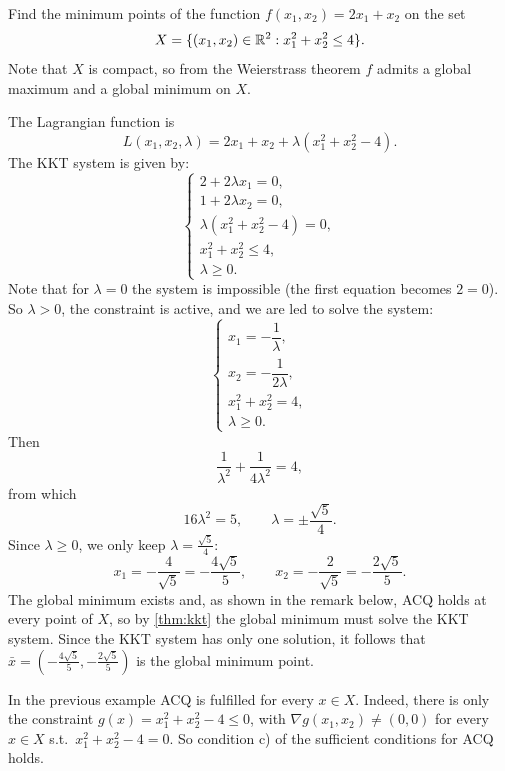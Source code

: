 \begin{example}
    \label{ex:kkt-circle}
    Find the minimum points of the function $f(x_1, x_2) = 2x_1 + x_2$ on the set
    \[
        X = \{(x_1, x_2) \in \mathbb{R}^2 : x_1^2 + x_2^2 \le 4\}.
    \]
    Note that $X$ is compact, so from the Weierstrass theorem $f$ admits a global maximum and a global minimum on $X$.

    The Lagrangian function is
    \[
        L(x_1, x_2, \lambda) = 2x_1 + x_2 + \lambda(x_1^2 + x_2^2 - 4).
    \]
    The KKT system is given by:
    \[
        \begin{cases}
            2 + 2\lambda x_1 = 0,\\
            1 + 2\lambda x_2 = 0,\\
            \lambda(x_1^2 + x_2^2 - 4) = 0,\\
            x_1^2 + x_2^2 \le 4,\\
            \lambda \ge 0.
        \end{cases}
    \]
    Note that for $\lambda = 0$ the system is impossible (the first equation becomes $2 = 0$). So $\lambda > 0$, the constraint is active, and we are led to solve the system:
    \[
        \begin{cases}
            x_1 = -\dfrac{1}{\lambda},\\[2mm]
            x_2 = -\dfrac{1}{2\lambda},\\[2mm]
            x_1^2 + x_2^2 = 4,\\
            \lambda \ge 0.
        \end{cases}
    \]
    Then
    \[
        \frac{1}{\lambda^2} + \frac{1}{4\lambda^2} = 4,
    \]
    from which
    \[
        16\lambda^2 = 5, \qquad \lambda = \pm \frac{\sqrt{5}}{4}.
    \]
    Since $\lambda \ge 0$, we only keep $\lambda = \frac{\sqrt{5}}{4}$:
    \[
        x_1 = -\frac{4}{\sqrt{5}} = -\frac{4\sqrt{5}}{5}, \qquad x_2 = -\frac{2}{\sqrt{5}} = -\frac{2\sqrt{5}}{5}.
    \]
    The global minimum exists and, as shown in the remark below, ACQ holds at every point of $X$, so by \cref{thm:kkt} the global minimum must solve the KKT system. Since the KKT system has only one solution, it follows that $\bar{x} = \left(-\frac{4\sqrt{5}}{5}, -\frac{2\sqrt{5}}{5}\right)$ is the global minimum point.
\end{example}

\begin{remark}
    In the previous example ACQ is fulfilled for every $x \in X$. Indeed, there is only the constraint $g(x) = x_1^2 + x_2^2 - 4 \le 0$, with $\nabla g(x_1, x_2) \neq (0, 0)$ for every $x \in X$ s.t.\ $x_1^2 + x_2^2 - 4 = 0$. So condition c) of the sufficient conditions for ACQ holds.
\end{remark}

